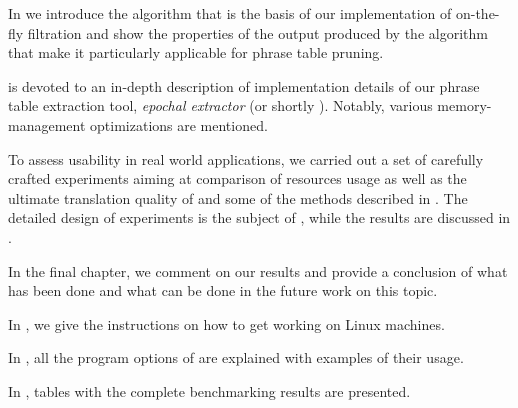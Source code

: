In  we introduce the algorithm that is the basis of our implementation
of on-the-fly filtration and show the properties of the output produced
by the algorithm that make it particularly applicable for phrase table pruning.

 is devoted to an in-depth description of implementation details of our
phrase table extraction tool, \emph{epochal extractor} (or shortly \eppex{}).
Notably, various memory-management optimizations are mentioned.

To assess \eppex{} usability in real world applications, we carried out a set
of carefully crafted experiments aiming at comparison of resources usage as well as
the ultimate translation quality of \eppex{} and some of the methods described
in .
The detailed design of experiments is the subject of ,
while the results are discussed in .

In the final chapter, we comment on our results and provide a conclusion of
what has been done and what can be done in the future work on this topic.

In , we give the instructions on how to get \eppex{} working on Linux machines.

In , all the program options of \eppex{} are explained with examples of their usage.

In , tables with the complete benchmarking results are presented.
